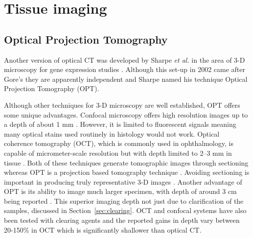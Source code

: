 	
	
	
	
	
	
	
	
	
	
	
	\section{Tissue imaging}
	\label{sec:tissue}
	\subsection{Optical Projection Tomography}
	\label{subsec:OPT}
	Another version of optical CT was  developed by Sharpe \textit{et al.} in the area of 3-D microscopy for gene expression studies \cite{Sharpe:2002jp}. Although this set-up in 2002 came after Gore's they are apparently independent and Sharpe named his technique Optical Projection Tomography (OPT).
	
	Although other techniques for 3-D microscopy are well established, OPT offers some unique advantages. 
	Confocal microscopy offers high resolution images up to a depth of about 1 mm \cite{Webb:1996}. However, it is limited to fluorescent signals meaning many optical stains used routinely in histology would not work. Optical coherence tomography (OCT), which is commonly used in ophthalmology, is capable of micrometer-scale resolution but with  depth limited to 2--3 mm in tissue \cite{huang1993optical}. Both of these techniques generate tomographic images through sectioning whereas OPT is a projection based tomography technique \cite{Sharpe:2003cm}. Avoiding sectioning is important in producing truly representative 3-D images \cite{Oldham:2007ku}. Another advantage of  OPT is its ability to  image much larger specimen, with depth of around 3 cm being reported \cite{Oldham:2007ku}. This superior imaging depth not just due to clarification of the samples, discussed in Section~\ref{sec:clearing}. OCT and confocal systems have also been tested with clearing agents and the reported gains in depth vary between 20-150\% in OCT \cite{Tuchin:2002} which is significantly shallower than optical CT.
	
